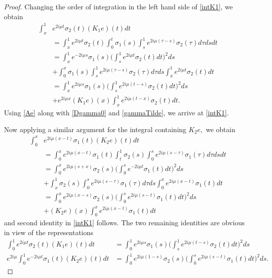 \documentclass[11pt]{amsart}
\theoremstyle{plain}
\theoremstyle{definition}
\theoremstyle{remark}
\numberwithin{equation}{section}
\begin{document}
\begin{proof}
Changing the order of integration in the left hand side of \eqref{intK1}, we obtain
\begin{align}
\int_x^1& e^{2i \mu t }\sigma_2(t)(K_1e)(t)dt\nonumber\\
&=\int_x^1 e^{2i \mu t }\sigma_2(t)\int_0^t\sigma_1(s)\int_s^1 e^{2i \mu (\tau-s) }\sigma_2(\tau)d \tau ds dt\nonumber\\
&=\int_x^1 e^{-2i \mu s }\sigma_1(s)\Big(\int_s^1e^{2i \mu t } \sigma_2(t)dt\Big)^2 ds\nonumber\\
&+\int_0^x \sigma_1(s)\int_s^1 e^{2i \mu(\tau-s )}\sigma_2(\tau)d\tau ds\int_x^1 e^{2i \mu t }\sigma_2(t)dt\nonumber\\
&=\int_x^1 e^{2i \mu s }\sigma_1(s)\Big(\int_s^1e^{2i \mu (t-s) } \sigma_2(t)dt\Big)^2 ds \nonumber\\
&+e^{2i\mu x}(K_1e)(x)\int_x^1 e^{2i \mu (t-x) }\sigma_2(t)dt\label{calkK1}.
\end{align}
Using \eqref{Ae} along with \eqref{Dgamma0} and \eqref{gammaTilde}, we arrive at \eqref{intK1}.

Now
applying a similar argument
 for the integral containing $K_2e,$ we obtain
\begin{align}
\int_0^x &e^{2i \mu (x-t) }\sigma_1(t)(K_2e)(t)dt\nonumber\\
&=\int_0^x e^{2i \mu (x-t) }\sigma_1(t)\int_t^1\sigma_2(s)\int_0^s e^{2i \mu (s-\tau) }\sigma_1(\tau)d \tau ds dt\nonumber\\
&=\int_0^x e^{2i \mu (s+x) }\sigma_2(s)\Big(\int_0^se^{-2i \mu t } \sigma_1(t)dt\Big)^2 ds\nonumber\\
&+\int_x^1 \sigma_2(s)\int_0^s e^{2i \mu(s- \tau )}\sigma_1(\tau)d\tau ds\int_0^x e^{2i \mu(x- t) }\sigma_1(t)dt\nonumber\\
&=\int_0^x e^{2i \mu(x- s) }\sigma_2(s)\Big(\int_0^se^{2i \mu(s-t) } \sigma_1(t)dt\Big)^2 ds\nonumber\\
&+(K_2e)(x)\int_0^x e^{2i \mu(x-t) }\sigma_1(t)dt\label{calkK2}
\end{align}
and second identity in \eqref{intK1} follows.
The two remaining identities are obvious in view of  the representations
\begin{align*}
\int_0^1 e^{2i \mu t }\sigma_2(t)(K_1e)(t)dt&=
\int_0^1 e^{2i \mu s }\sigma_1(s)\Big(\int_s^1e^{2i \mu (t-s) } \sigma_2(t)dt\Big)^2 ds\\
e^{2i \mu}\int_0^1 e^{-2i \mu t }\sigma_1(t)(K_2e)(t)dt&=
\int_0^1 e^{2i \mu (1-s) }\sigma_2(s)\Big(\int_0^se^{2i \mu (s-t) } \sigma_1(t)dt\Big)^2 ds.
\end{align*}
\end{proof}
\end{document}
